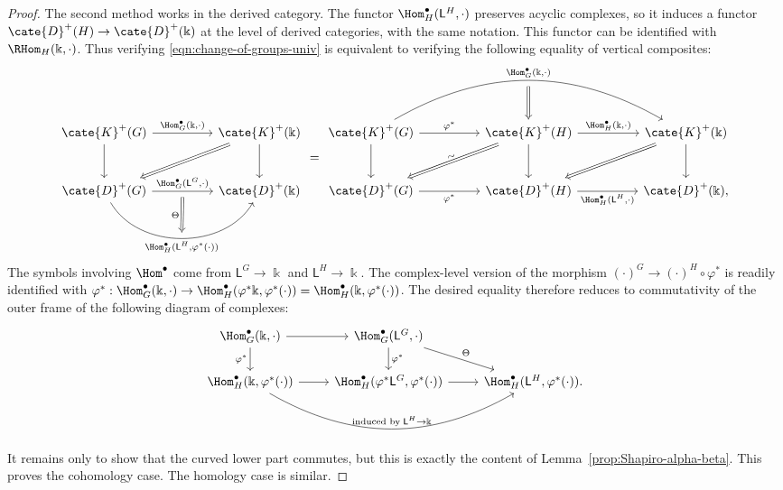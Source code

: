 \begin{proof}
	The second method works in the derived category. The functor
	$\Hom^\bullet_H(\mathsf{L}^H,\cdot)$ preserves acyclic complexes, so it
	induces a functor $\cate{D}^+(H)\to\cate{D}^+(\Bbbk)$ at the level of
	derived categories, with the same notation. This functor can be
	identified with $\RHom_H(\Bbbk,\cdot)$. Thus verifying
	\eqref{eqn:change-of-groups-univ} is equivalent to verifying the following
	equality of vertical composites:
	\begin{equation*}
		\begin{tikzcd}[column sep=huge, row sep=large]
			\cate{K}^+(G) \arrow[r, "{\Hom^\bullet_G(\Bbbk, \cdot)}"] \arrow[d] & \cate{K}^+(\Bbbk) \arrow[d] \arrow[Rightarrow, ld] \\
			\cate{D}^+(G) \arrow[r, "{\Hom^\bullet_G(\mathsf{L}^G, \cdot)}", ""' {name=D}] \arrow[r, bend right=60, "" {name=U}, "{\Hom^\bullet_H(\mathsf{L}^H, \varphi^*(\cdot))}"'] & \cate{D}^+(\Bbbk) \arrow[Rightarrow, from=D, to=U, "\Theta"']
		\end{tikzcd} = \begin{tikzcd}[column sep=huge, row sep=large]
			\cate{K}^+(G) \arrow[d] \arrow[r, "{\varphi^*}"] \arrow[rr, bend left, "{\Hom^\bullet_G(\Bbbk, \cdot)}", "{}"' {name=U}] & \cate{K}^+(H) \arrow[d] \arrow[r, "{\Hom^\bullet_H(\Bbbk, \cdot)}"] \arrow[from=U, Rightarrow] \arrow[Rightarrow, ld, "\sim" sloped] & \cate{K}^+(\Bbbk) \arrow[d] \arrow[Rightarrow, ld] \\
			\cate{D}^+(G) \arrow[r, "{\varphi^*}"'] & \cate{D}^+(H) \arrow[r, "{\Hom^\bullet_H(\mathsf{L}^H, \cdot)}"'] & \cate{D}^+(\Bbbk) ,
		\end{tikzcd}
	\end{equation*}
	The symbols  involving
	$\Hom^\bullet$ come from $\mathsf{L}^G\to\Bbbk$ and
	$\mathsf{L}^H\to\Bbbk$. The complex-level version of the morphism
	$(\cdot)^G\to(\cdot)^H\circ\varphi^*$ is readily identified with
	$\varphi^*:\Hom^\bullet_G(\Bbbk,\cdot)\to
	\Hom^\bullet_H(\varphi^*\Bbbk,\varphi^*(\cdot))
	=\Hom^\bullet_H(\Bbbk,\varphi^*(\cdot))$. The desired equality therefore
	reduces to commutativity of the outer frame of the following diagram of
	complexes:
	\[\begin{tikzcd}
		\Hom^\bullet_G(\Bbbk, \cdot) \arrow[r] \arrow[d, "{\varphi^*}"'] & \Hom^\bullet_G(\mathsf{L}^G, \cdot) \arrow[d, "{\varphi^*}"] \arrow[rd, "\Theta"] & \\
		\Hom^\bullet_H(\Bbbk, \varphi^*(\cdot)) \arrow[r] \arrow[rr, bend right=30, "{\text{induced by}\; \mathsf{L}^H \to \Bbbk}"] & \Hom^\bullet_H(\varphi^* \mathsf{L}^G, \varphi^*(\cdot)) \arrow[r] & \Hom^\bullet_H(\mathsf{L}^H, \varphi^*(\cdot)).
	\end{tikzcd}\]
	It remains only to show that the curved lower part commutes, but this is
	exactly the content of Lemma~\ref{prop:Shapiro-alpha-beta}. This proves the
	cohomology case. The homology case is similar.


\end{proof}
